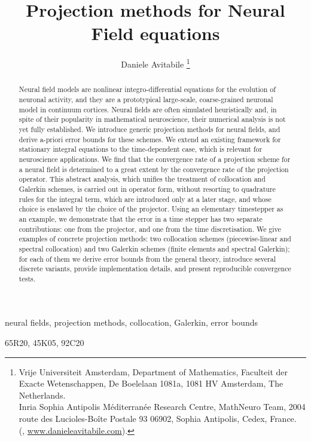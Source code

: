 \documentclass[a4paper,baskervaldx]{daarticle}
\title{Projection methods for Neural Field equations}
\author{%
  Daniele Avitabile%
  \thanks{%
    Vrije Universiteit Amsterdam,
    Department of Mathematics,
    Faculteit der Exacte Wetenschappen,
    De Boelelaan 1081a,
    1081 HV Amsterdam, The Netherlands.
  \protect\\
    Inria Sophia Antipolis M\'editerran\'ee Research Centre,
    MathNeuro Team,
    2004 route des Lucioles-Boîte Postale 93 06902,
    Sophia Antipolis, Cedex, France.
  \protect\\
    (\email{d.avitabile@vu.nl}, \url{www.danieleavitabile.com}).
  }%
}
\begin{document}
\maketitle

\begin{abstract}
  Neural field models are nonlinear integro-differential equations for the evolution
  of neuronal activity, and they are a prototypical large-scale, coarse-grained
  neuronal model in continuum cortices. Neural fields are often simulated
  heuristically and, in spite of their popularity in mathematical neuroscience,
  their numerical analysis is not yet fully established. We introduce generic
  projection methods for neural fields, and derive a-priori error bounds for these
  schemes. We extend an existing framework for
  stationary integral equations to the time-dependent case, which is relevant for
  neuroscience applications. We find that the convergence rate of a projection scheme for a
  neural field is determined to a great extent by the convergence rate of the
  projection operator. This abstract analysis, which unifies the treatment of
  collocation and Galerkin schemes, is carried out in operator form, without
  resorting to quadrature rules for the integral term, which are
  introduced only at a later stage, and whose choice is enslaved by the choice of the
  projector. Using an elementary timestepper as an example, we demonstrate that the
  error in a time stepper has two separate contributions: one from the projector, and
  one from the time discretisation. We give examples of concrete projection methods: two
  collocation schemes (piecewise-linear and spectral collocation) and two Galerkin
  schemes (finite elements and spectral Galerkin); for each of them we derive error
  bounds from the general theory, introduce several discrete variants, provide
  implementation details, and present reproducible convergence tests.
\end{abstract}

\begin{keywords}
  neural fields, projection methods, collocation, Galerkin, error bounds
\end{keywords}

\begin{MSCcodes}
  65R20, 45K05, 92C20
\end{MSCcodes}
\end{document}
